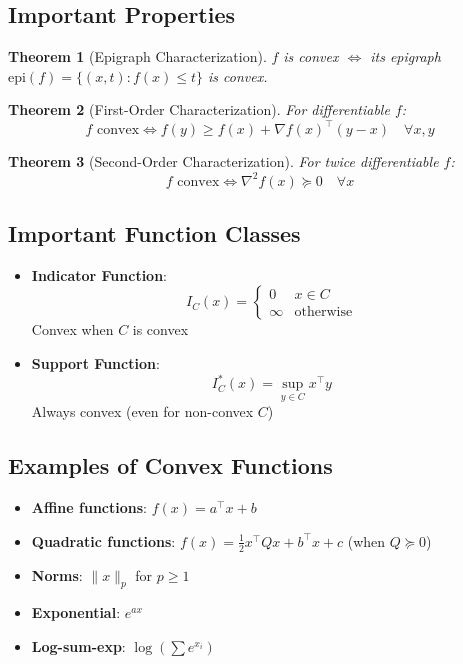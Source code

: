 \documentclass{article}
\theoremstyle{plain}
\newtheorem{theorem}{Theorem}[section]
\begin{document}
\subsection{Important Properties}
\begin{itemize}
    \begin{theorem}[Epigraph Characterization]
\( f \) is convex \(\iff\) its epigraph \( \text{epi}(f) = \{(x,t) : f(x) \leq t\} \) is convex.
\end{theorem}
    
    \begin{theorem}[First-Order Characterization]
For differentiable \( f \):
\[
f \text{ convex} \iff f(y) \geq f(x) + \nabla f(x)^\top (y - x) \quad \forall x,y
\]
\end{theorem}

\begin{theorem}[Second-Order Characterization]
For twice differentiable \( f \):
\[
f \text{ convex} \iff \nabla^2 f(x) \succeq 0 \quad \forall x
\]
\end{theorem}
\end{itemize}

\subsection{Important Function Classes} %
\begin{itemize}
    \item \textbf{Indicator Function}:
    \[
    I_C(x) = \begin{cases} 
    0 & x \in C \\
    \infty & \text{otherwise}
    \end{cases}
    \]
    Convex when \( C \) is convex
    
    \item \textbf{Support Function}:
    \[
    I_C^*(x) = \sup_{y \in C} x^\top y
    \]
    Always convex (even for non-convex \( C \))
\end{itemize}

\subsection{Examples of Convex Functions}
\begin{itemize}
    \item \textbf{Affine functions}: \( f(x) = a^\top x + b \)
    
    \item \textbf{Quadratic functions}: \( f(x) = \frac{1}{2}x^\top Q x + b^\top x + c \) (when \( Q \succeq 0 \))
    
    \item \textbf{Norms}: \( \|x\|_p \) for \( p \geq 1 \)
    
    \item \textbf{Exponential}: \( e^{ax} \)
    
    \item \textbf{Log-sum-exp}: \( \log(\sum e^{x_i}) \)
\end{itemize}
\end{document}
